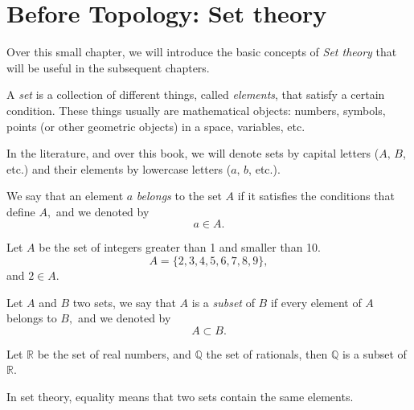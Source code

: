 \documentclass[
	fontsize=10pt, %
	twoside=false, %
	secnumdepth=1, %
]{kaobook}
\begin{document}
\listoftables %

\endgroup


\mainmatter %

\chapter*{Before Topology: Set theory}

Over this small chapter, we will introduce the basic concepts of \emph{Set theory} that will be useful in the subsequent chapters.

A \emph{set} is a collection of different things, called \emph{elements}, that satisfy a certain condition. These things usually are mathematical objects: numbers, symbols, points (or other geometric objects) in a space, variables, etc. 

In the literature, and over this book, we will denote sets by capital letters ($A, \, B$, etc.) and their elements by lowercase letters ($a,\, b$, etc.). 

We say that an element $a$ \emph{belongs} to the set $A$ if it satisfies the conditions that define $A,$ and we denoted by $$a\in A.$$

\begin{example}
Let $A$ be the set of integers greater than 1 and smaller than 10. $$A=\{2,3,4,5,6,7,8,9\},$$ and $2\in A.$
\end{example}

\begin{definition}[Subset]
Let $A$ and $B$ two sets, we say that $A$ is a \emph{subset} of $B$ if every element of $A$ belongs to $B,$ and we denoted by $$A\subset B.$$
\end{definition}

\begin{example}
Let $\mathbb{R}$ be the set of real numbers, and $\mathbb{Q}$ the set of rationals, then $\mathbb{Q}$ is a subset of $\mathbb{R}.$
\end{example}

In set theory, equality means that two sets contain the same elements.
\end{document}
